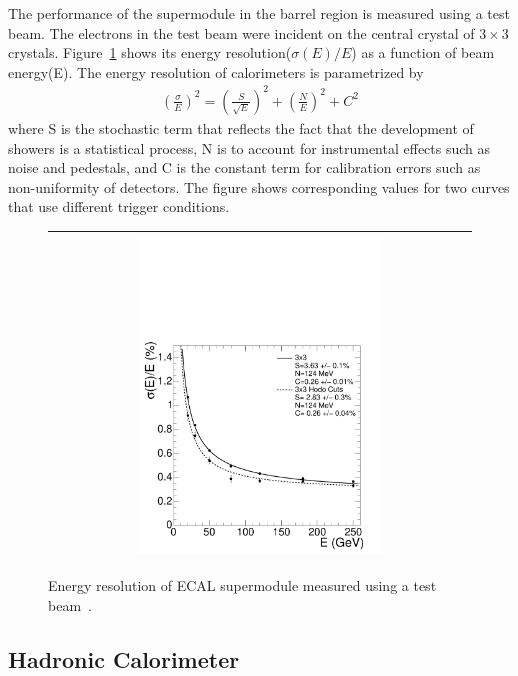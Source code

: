 The performance of the supermodule in the barrel region is measured 
using a test beam. The electrons in the test beam were incident on 
the central crystal of $3\times 3$ crystals.
Figure~\ref{fig:ecal_res} shows its energy resolution($\sigma(E)/E$)
as a function of beam energy(E). The energy resolution of calorimeters is 
parametrized by 
\begin{eqnarray}
\left( \frac{\sigma}{E} \right)^2 
= 
\left( \frac{S}{\sqrt{E}}  \right)^2 + \left( \frac{N}{E} \right)^2 + C^2
\end{eqnarray} 
where S is the stochastic term that reflects the fact that the development of showers is    
a statistical process, N is to account for instrumental effects such as noise and pedestals, 
and C is the constant term for calibration errors such as non-uniformity of detectors.  
The figure shows corresponding values for two curves that use different trigger 
conditions. 

%
\begin{figure}[h] 
\vspace{1cm}
\centering 
\begin{tabular}{|c|} 
\hline
\includegraphics[width=0.6\textwidth]{figures/Figure_001-007.pdf}\\
\hline
\end{tabular} 
\caption{Energy resolution of ECAL supermodule measured using a test beam~\cite{cmstdr1}.}
\label{fig:ecal_res} 
\end{figure} 


\subsection{Hadronic Calorimeter} 

